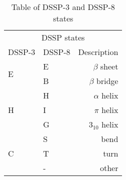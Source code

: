 \documentclass{article}
\begin{document}
\begin{table}
\centering
\begin{tabular}{l|lr}
\hline
\multicolumn{3}{c}{DSSP states} \\
\cline{1-3}
DSSP-3    & DSSP-8 & Description  \\
\hline
\multirow{2}{*}{E}& E       & $\beta$ sheet\\
&B      & $\beta$ bridge\\ 
\hline
\multirow{3}{*}{H}&H      & $\alpha$ helix\\
&I      & $\pi$ helix\\
&G       & $3_{10}$ helix\\ 
\hline
\multirow{3}{*}{C}&S       & bend\\
&T      & turn\\
&-       & other\\

\hline
\end{tabular}
\caption{Table of DSSP-3 and DSSP-8 states}
\label{table:dssp_states}
\end{table}
\end{document}
